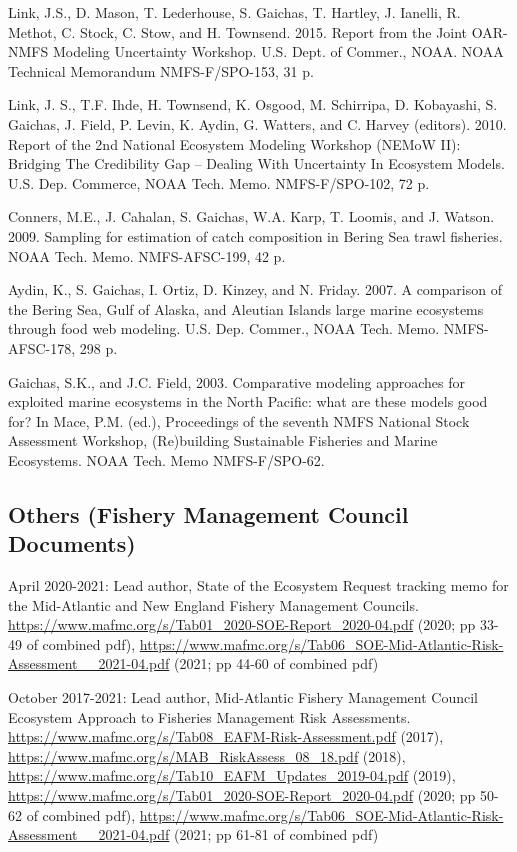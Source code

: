 \documentclass[11pt, a4paper]{awesome-cv}
\begin{document}
Link, J.S., D. Mason, T. Lederhouse, S. Gaichas, T. Hartley, J. Ianelli,
R. Methot, C. Stock, C. Stow, and H. Townsend. 2015. Report from the
Joint OAR-NMFS Modeling Uncertainty Workshop. U.S. Dept. of Commer.,
NOAA. NOAA Technical Memorandum NMFS-F/SPO-153, 31 p.

Link, J. S., T.F. Ihde, H. Townsend, K. Osgood, M. Schirripa, D.
Kobayashi, S. Gaichas, J. Field, P. Levin, K. Aydin, G. Watters, and C.
Harvey (editors). 2010. Report of the 2nd National Ecosystem Modeling
Workshop (NEMoW II): Bridging The Credibility Gap -- Dealing With
Uncertainty In Ecosystem Models. U.S. Dep. Commerce, NOAA Tech. Memo.
NMFS-F/SPO-102, 72 p.

Conners, M.E., J. Cahalan, S. Gaichas, W.A. Karp, T. Loomis, and J.
Watson. 2009. Sampling for estimation of catch composition in Bering Sea
trawl fisheries. NOAA Tech. Memo. NMFS-AFSC-199, 42 p.~

Aydin, K., S. Gaichas, I. Ortiz, D. Kinzey, and N. Friday. 2007. A
comparison of the Bering Sea, Gulf of Alaska, and Aleutian Islands large
marine ecosystems through food web modeling. U.S. Dep. Commer., NOAA
Tech. Memo. NMFS-AFSC-178, 298 p.

Gaichas, S.K., and J.C. Field, 2003. Comparative modeling approaches for
exploited marine ecosystems in the North Pacific: what are these models
good for? In Mace, P.M. (ed.), Proceedings of the seventh NMFS National
Stock Assessment Workshop, (Re)building Sustainable Fisheries and Marine
Ecosystems. NOAA Tech. Memo NMFS-F/SPO-62.

\hypertarget{others-fishery-management-council-documents}{%
\subsection{Others (Fishery Management Council
Documents)}\label{others-fishery-management-council-documents}}

April 2020-2021: Lead author, State of the Ecosystem Request tracking
memo for the Mid-Atlantic and New England Fishery Management Councils.
\url{https://www.mafmc.org/s/Tab01_2020-SOE-Report_2020-04.pdf} (2020;
pp 33-49 of combined pdf),
\url{https://www.mafmc.org/s/Tab06_SOE-Mid-Atlantic-Risk-Assessment__2021-04.pdf}
(2021; pp 44-60 of combined pdf)

October 2017-2021: Lead author, Mid-Atlantic Fishery Management Council
Ecosystem Approach to Fisheries Management Risk Assessments.
\url{https://www.mafmc.org/s/Tab08_EAFM-Risk-Assessment.pdf} (2017),
\url{https://www.mafmc.org/s/MAB_RiskAssess_08_18.pdf} (2018),
\url{https://www.mafmc.org/s/Tab10_EAFM_Updates_2019-04.pdf} (2019),
\url{https://www.mafmc.org/s/Tab01_2020-SOE-Report_2020-04.pdf} (2020;
pp 50-62 of combined pdf),
\url{https://www.mafmc.org/s/Tab06_SOE-Mid-Atlantic-Risk-Assessment__2021-04.pdf}
(2021; pp 61-81 of combined pdf)
\end{document}
